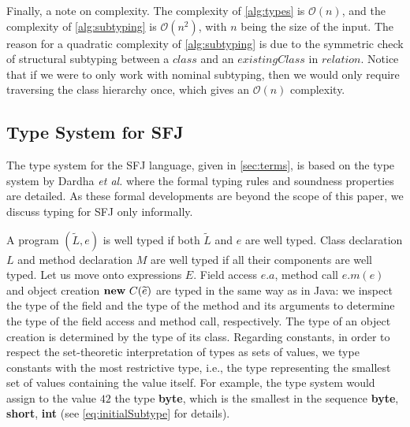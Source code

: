 \documentclass[runningheads]{llncs}
\begin{document}
Finally, a note on complexity.
The complexity of \autoref{alg:types} is $\mathcal{O}(n)$, and the complexity of \autoref{alg:subtyping} is $\mathcal{O}(n^{2})$, with $n$ being the size of the input.
The reason for a quadratic complexity of \autoref{alg:subtyping} is due to the symmetric check of structural subtyping between a $class$ and an $existingClass$ in $relation$.
Notice that if we were to only work with nominal subtyping, then we would only require traversing the class hierarchy once,  which gives an $\mathcal{O}(n)$ complexity.

\subsection{Type System for SFJ}
\label{sec:typing}

The type system for the SFJ language, given in \autoref{sec:terms}, is based on the type system by Dardha \emph{et al.} \cite{Dardha2013,Dardha2017} where the formal typing rules and soundness properties are detailed. As these formal developments are beyond the scope of this paper, we discuss typing for SFJ only informally.

A program $(\tilde L,e)$ is well typed if both $\tilde{L}$ and $e$ are well typed.
Class declaration $L$ and method declaration $M$ are well typed if all their components are well typed.
Let us move onto expressions $E$.
Field access $e.a$, method call $e.m(e)$ and object creation $\mathbf{new}\  C(\widetilde{e})$ are typed in the same way as in Java: we inspect the type of the field and the type of the method and its arguments to determine the type of the field access and method call, respectively. The type of an object creation is determined by the type of its class.
Regarding constants, in order to respect the set-theoretic interpretation of types as sets of values, we type constants with the most restrictive type, i.e., the type representing the smallest set of values containing the value itself.
For example, the type system would assign to the value $42$ the type \textbf{byte}, which is the smallest in the sequence \textbf{byte}, \textbf{short}, \textbf{int} (see \autoref{eq:initialSubtype} for details).

\end{document}
